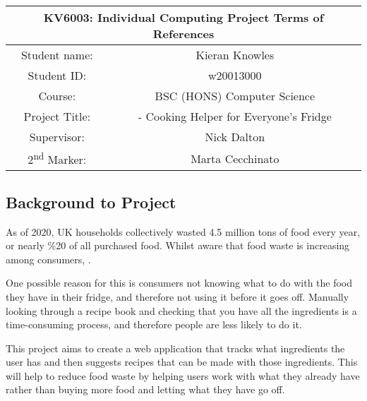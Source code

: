 \documentclass[../CHEFCookingHelperForEveryonesFridge.tex]{subfiles}
\begin{document}
\begin{table}[h!]
    \centering
    \begin{tabular}{|c|c|}
        \hline
        \multicolumn{2}{|c|}{KV6003: Individual Computing Project Terms of References} \\\hline
        Student name: & Kieran Knowles \\\hline
        Student ID: & w20013000 \\\hline
        Course: & BSC (HONS) Computer Science \\\hline
        Project Title: & \chef{} - Cooking Helper for Everyone's Fridge \\\hline
        Supervisor: & Nick Dalton \\\hline
        2\textsuperscript{nd} Marker: & Marta Cecchinato \\\hline
    \end{tabular}
\end{table}

\subsection{Background to Project}
As of 2020, UK households collectively wasted 4.5 million tons of food every year, or nearly \%{20} of all purchased food.
Whilst aware that food waste is increasing among consumers,  \cite{wrap_uk_2020}.

One possible reason for this is consumers not knowing what to do with the food they have in their fridge, and therefore not using it before it goes off.
Manually looking through a recipe book and checking that you have all the ingredients is a time-consuming process, and therefore people are less likely to do it.

This project aims to create a web application that tracks what ingredients the user has and then suggests recipes that can be made with those ingredients.
This will help to reduce food waste by helping users work with what they already have rather than buying more food and letting what they have go off.
\end{document}
